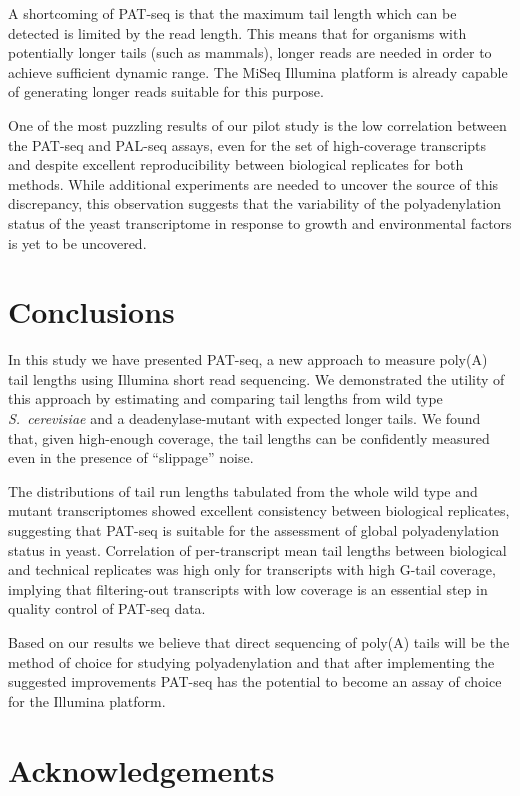 \documentclass[10pt]{article}
\begin{document}
A shortcoming of PAT-seq is that the maximum tail length which can be detected is limited by the read length. This means that for organisms with potentially longer tails (such as mammals), longer reads are needed in order to achieve sufficient dynamic range. The MiSeq Illumina platform is already capable of generating longer reads suitable for this purpose.

One of the most puzzling results of our pilot study is the low correlation between the PAT-seq and PAL-seq assays, even for the set of high-coverage transcripts and despite excellent reproducibility between biological replicates for both methods. While additional experiments are needed to uncover the source of this discrepancy, this observation suggests that the variability of the polyadenylation status of the yeast transcriptome in response to growth and environmental factors is yet to be uncovered.

\section*{Conclusions}

In this study we have presented PAT-seq, a new approach to measure poly(A) tail lengths using Illumina short read sequencing. We demonstrated the utility of this approach by estimating and comparing tail lengths from wild type \textit{S.~cerevisiae} and a deadenylase-mutant with expected longer tails. We found that, given high-enough coverage, the tail lengths can be confidently measured even in the presence of ``slippage'' noise.

The distributions of tail run lengths tabulated from the whole wild type and mutant transcriptomes showed excellent consistency between biological replicates, suggesting that PAT-seq is suitable for the assessment of global polyadenylation status in yeast.
Correlation of per-transcript mean tail lengths between biological and technical replicates was high only for transcripts with high G-tail coverage, implying that filtering-out transcripts with low coverage is an essential step in quality control of PAT-seq data.

Based on our results we believe that direct sequencing of poly(A) tails will be the method of choice for studying polyadenylation and that after implementing the suggested improvements PAT-seq has the potential to become an assay of choice for the Illumina platform.
\section*{Acknowledgements}
\end{document}
